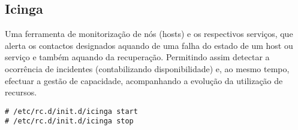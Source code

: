 \subsection{Icinga}

Uma ferramenta de monitorização de nós (hosts) e os respectivos serviços, que alerta os contactos designados aquando de uma falha do estado de um host ou serviço e também aquando da recuperação. Permitindo assim detectar a ocorrência de incidentes (contabilizando disponibilidade) e, ao mesmo tempo, efectuar a gestão de capacidade, acompanhando a evolução da utilização de recursos.

\begin{Verbatim}[commandchars=\\\{\}]
# /etc/rc.d/init.d/icinga start
# /etc/rc.d/init.d/icinga stop
\end{Verbatim}

